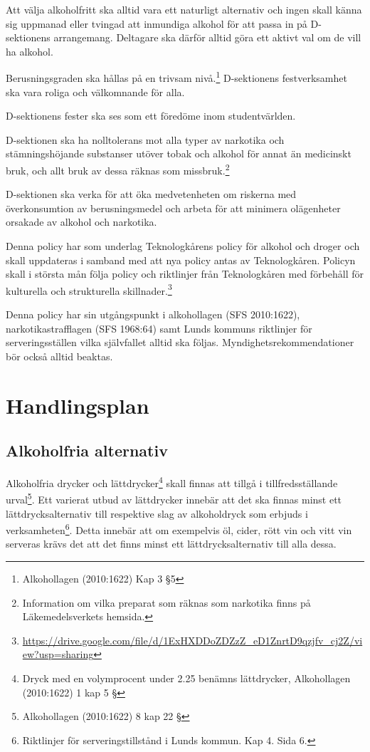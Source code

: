 \documentclass[]{dsekkallelse}
\begin{document}
Att välja alkoholfritt ska alltid vara ett naturligt alternativ och ingen skall känna sig uppmanad eller tvingad att inmundiga alkohol för att passa in på D-sektionens arrangemang. Deltagare ska därför alltid göra ett aktivt val om de vill ha alkohol.

Berusningsgraden ska hållas på en trivsam nivå.\footnote{Alkohollagen (2010:1622) Kap 3 §5} D-sektionens festverksamhet ska vara
roliga och välkomnande för alla.

D-sektionens fester ska ses som ett föredöme inom studentvärlden.

D-sektionen ska ha nolltolerans mot alla typer av narkotika och stämningshöjande substanser utöver tobak och alkohol för annat än medicinskt bruk, och allt bruk av dessa räknas som missbruk.\footnote{Information om vilka preparat som räknas som narkotika finns på Läkemedelsverkets hemsida.}

D-sektionen ska verka för att öka medvetenheten om riskerna med överkonsumtion av
berusningsmedel och arbeta för att minimera olägenheter orsakade av alkohol och narkotika.

Denna policy har som underlag Teknologkårens policy för alkohol och droger och skall uppdateras i samband med att nya policy antas av Teknologkåren. Policyn skall i största mån följa policy och riktlinjer från Teknologkåren med förbehåll för kulturella och strukturella skillnader.\footnote{\url{https://drive.google.com/file/d/1ExHXDDoZDZzZ_eD1ZnrtD9qzjfv_cj2Z/view?usp=sharing}}

Denna policy har sin utgångspunkt i alkohollagen (SFS 2010:1622), narkotikastrafflagen
(SFS 1968:64) samt Lunds kommuns riktlinjer för serveringsställen vilka självfallet alltid ska
följas. Myndighetsrekommendationer bör också alltid beaktas.

\section{Handlingsplan}
\subsection{Alkoholfria alternativ}
Alkoholfria drycker och lättdrycker\footnote{Dryck med en volymprocent under 2.25 benämns lättdrycker, Alkohollagen (2010:1622) 1 kap 5 §} skall finnas att tillgå i tillfredsställande urval\footnote{Alkohollagen (2010:1622) 8 kap 22 §}. Ett varierat utbud av lättdrycker innebär att det ska finnas minst ett lättdrycksalternativ till respektive slag av alkoholdryck som erbjuds i verksamheten\footnote{Riktlinjer för serveringstillstånd i Lunds kommun. Kap 4. Sida 6.}. Detta innebär att om exempelvis öl, cider, rött
vin och vitt vin serveras krävs det att det finns minst ett lättdrycksalternativ till alla dessa.
\end{document}
